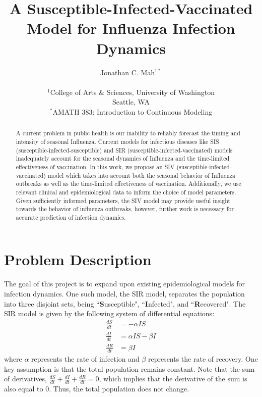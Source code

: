 \documentclass[11pt]{article}
\title{A Susceptible-Infected-Vaccinated Model for Influenza Infection Dynamics}
\author
{Jonathan C. Mah$^{1*}$\\
\\
\footnotesize{$^1$College of Arts \& Sciences, University of Washington}\\
\footnotesize{Seattle, WA}\\
\footnotesize{$^*$AMATH 383: Introduction to Continuous Modeling}\\
}
\date{}
\begin{document}
 


\maketitle 


\begin{abstract}
\noindent  
A current problem in public health is our inability to reliably forecast the timing and intensity of seasonal Influenza. Current models for infectious diseases like SIS (susceptible-infected-susceptible) and SIR (susceptible-infected-vaccinated) models inadequately account for the seasonal dynamics of Influenza and the time-limited effectiveness of vaccination. In this work, we propose an SIV (susceptible-infected-vaccinated) model which takes into account both the seasonal behavior of Influenza outbreaks as well as the time-limited effectiveness of vaccination. Additionally, we use relevant clinical and epidemiological data to inform the choice of model parameters. Given sufficiently informed parameters, the SIV model may provide useful insight towards the behavior of influenza outbreaks, however, further work is necessary for accurate prediction of infection dynamics.
\end{abstract}

\clearpage

\section*{Problem Description} 

The goal of this project is to expand upon existing epidemiological models for infection dynamics. One such model, the SIR model, separates the population into three disjoint sets, being ``\textbf{S}usceptible", ``\textbf{I}nfected", and ``\textbf{R}ecovered". The SIR model is given by the following system of differential equations:
\begin{equation} \label{SIR}
\begin{aligned}
\frac{dS}{dt} &= -\alpha I S \\
\frac{dI}{dt} &= \alpha I S - \beta I \\
\frac{dR}{dt} &= \beta I 
\end{aligned}
\end{equation}
where $\alpha$ represents the rate of infection and $\beta$ represents the rate of recovery. One key assumption is that the total population remains constant. Note that the sum of derivatives, $\frac{dS}{dt} + \frac{dI}{dt} + \frac{dR}{dt} = 0$, which implies that the derivative of the sum is also equal to $0$. Thus, the total population does not change. 
\end{document}

